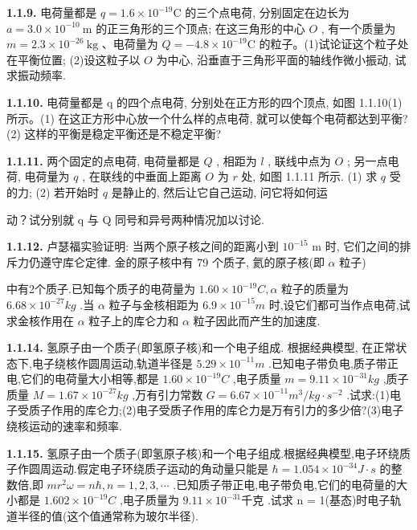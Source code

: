 \vfill

\newpage
\textbf{1.1.9.} 电荷量都是 $q = 1.6 \times 10^{-19} \mathrm{C}$ 的三个点电荷, 分别固定在边长为 $a = 3.0 \times 10^{-10} \mathrm{~m}$ 的正三角形的三个顶点; 在这三角形的中心 $O$ , 有一个质量为 $m = 2.3 \times 10^{-26} \mathrm{~kg}$ 、电荷量为 $Q = -4.8 \times 10^{-19} \mathrm{C}$ 的粒子。(1)试论证这个粒子处在平衡位置; (2)设这粒子以 $O$ 为中心, 沿垂直于三角形平面的轴线作微小振动, 试求振动频率.

\vfill

\textbf{1.1.10.} 电荷量都是 q 的四个点电荷, 分别处在正方形的四个顶点, 如图 1.1.10(1) 所示。(1) 在这正方形中心放一个什么样的点电荷, 就可以使每个电荷都达到平衡? (2) 这样的平衡是稳定平衡还是不稳定平衡?

\vfill

\newpage
\textbf{1.1.11.} 两个固定的点电荷, 电荷量都是 $Q$ , 相距为 $l$ , 联线中点为 $O$ ; 另一点电荷, 电荷量为 $q$ , 在联线的中垂面上距离 $O$ 为 $r$ 处, 如图 1.1.11 所示. (1) 求 $q$ 受的力; (2) 若开始时 $q$ 是静止的, 然后让它自己运动, 问它将如何运


动？试分别就 q 与 Q 同号和异号两种情况加以讨论.

\begin{center}
\end{center}

\vfill

\textbf{1.1.12.} 卢瑟福实验证明: 当两个原子核之间的距离小到 $10^{-15}$ m 时, 它们之间的排斥力仍遵守库仑定律. 金的原子核中有 79 个质子, 氦的原子核(即 $\alpha$ 粒子)

中有2个质子.已知每个质子的电荷量为 $1.60\times10^{-19}C,\alpha$ 粒子的质量为 $6.68\times10^{-27}kg$ .当 $\alpha$ 粒子与金核相距为 $6.9\times10^{-15}m$ 时,设它们都可当作点电荷,试求金核作用在 $\alpha$ 粒子上的库仑力和 $\alpha$ 粒子因此而产生的加速度.

\vfill

\newpage
\textbf{1.1.14.} 氢原子由一个质子(即氢原子核)和一个电子组成. 根据经典模型, 在正常状态下,电子绕核作圆周运动,轨道半径是 $5.29\times10^{-11}m$ .已知电子带负电,质子带正电,它们的电荷量大小相等,都是 $1.60\times10^{-19}C$ ,电子质量 $m=9.11\times10^{-31}kg$ ,质子质量 $M=1.67\times10^{-27}kg$ ,万有引力常数 $G=6.67\times10^{-11}m^{3}/kg\cdot s^{-2}$ .试求:(1)电子受质子作用的库仑力;(2)电子受质子作用的库仑力是万有引力的多少倍?(3)电子绕核运动的速率和频率.

\vfill

\textbf{1.1.15.} 氢原子由一个质子(即氢原子核)和一个电子组成.根据经典模型,电子环绕质子作圆周运动.假定电子环绕质子运动的角动量只能是 $\hbar = 1.054 \times 10^{-34} J \cdot s$ 的整数倍,即 $mr^{2}\omega = n\hbar, n = 1, 2, 3, \cdots$ .已知质子带正电,电子带负电,它们的电荷量的大小都是 $1.602 \times 10^{-19} C$ ,电子质量为 $9.11 \times 10^{-31} 千克$ .试求 n = 1(基态)时电子轨道半径的值(这个值通常称为玻尔半径).

